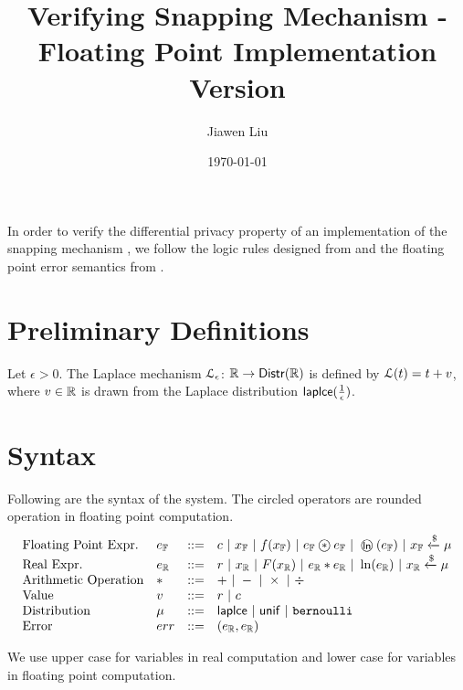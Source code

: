 \documentclass[a4paper,11pt]{article}
\begin{document}
\title{Verifying Snapping Mechanism - Floating Point Implementation Version}
\author{Jiawen Liu}

\date{\today}

\maketitle
In order to verify the differential privacy property of an implementation of the snapping mechanism \cite{mironov2012significance}, we follow the logic rules designed from \cite{barthe2016proving} and the floating point error semantics from \cite{Ramananandro2016unified,Martel2006higher,Becker2018verified,Moscato2017Automatic}.

\section{Preliminary Definitions}
\begin{defn}
Let $\epsilon > 0$. The Laplace mechanism  $\mathcal{L}_{\epsilon}$: $\mathbb{R} \to \mathsf{Distr}(\mathbb{R})$ is defined by $\mathcal{L}(t) = t + v$, where $v \in \mathbb{R}$ is drawn from the Laplace distribution $\mathsf{laplce}(\frac{1}{\epsilon})$.
\end{defn}
%
%
%
\section{Syntax}
Following are the syntax of the system. The circled operators are rounded operation in floating point computation.
\[\begin{array}{llll}
\mbox{Floating Point Expr.} & \fexpr & ::= & \fval
	~|~ \fvarx ~|~ f(\fvarx) ~|~ \fexpr \oop \fexpr
	~|~ \oln (\fexpr) ~|~ \fvarx \samplel \edistr \\
%
\mbox{Real Expr.} & \rexpr & ::= & \rval
	~|~ \rvarx ~|~ F(\rvarx) ~|~ \rexpr * \rexpr
	~|~ \ln (\rexpr) ~|~ \rvarx \samplel \edistr \\
%
\mbox{Arithmetic Operation} & * & ::= & + ~|~ - ~|~ \times ~|~ \div \\
%
\mbox{Value} & \valv & ::= & \rval ~|~  \fval \\
%
\mbox{Distribution} & \edistr & ::= & \laplace ~|~ \uniform ~|~ \bernoulli \\ 
%
\mbox{Error} & \err & ::= & (\rexpr, \rexpr) \\

\end{array}\]

We use upper case for variables in real computation and lower case for variables in floating point computation.
\end{document}
